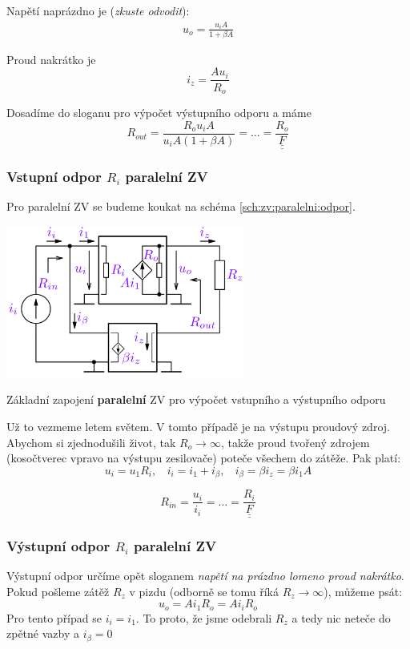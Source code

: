 \documentclass[a4paper,12pt]{article}   %
\begin{document}
Napětí naprázdno je (\textit{zkuste odvodit}):
\begin{align*}
    u_o = \frac{u_i A}{1+\beta A}
\end{align*}

Proud nakrátko je
\begin{equation*}
    i_z = \frac{A u_i}{R_o}
\end{equation*}

Dosadíme do sloganu pro výpočet výstupního odporu a máme
\begin{equation}
    R_{out} = \frac{R_o u_i A}{u_i A(1+\beta A)} =...= \underline{\underline{\frac{R_o}{F}}}
\end{equation}

\subsubsection{Vstupní odpor $R_i$ paralelní ZV}
Pro paralelní ZV se budeme koukat na schéma \ref{sch:zv:paralelni:odpor}.
\begin{schema}[h!]
    \centering
    \includegraphics[height=5cm]{ZV_paralelni-odpory.PNG}
    \caption{Základní zapojení \textbf{paralelní} ZV pro výpočet vstupního a výstupního odporu}
    \label{sch:zv:paralelni:odpor}
\end{schema}

Už to vezmeme letem světem. V tomto případě je na výstupu proudový zdroj. Abychom si zjednodušili život, tak $R_o \rightarrow \infty$, takže proud tvořený zdrojem (kosočtverec vpravo na výstupu zesilovače) poteče všechem do zátěže. Pak platí: 
\begin{equation}
    u_i = u_\text{1} R_i,~~~~i_i=i_\text{1} + i_\beta,~~~~ i_\beta = \beta i_z = \beta i_1 A
\end{equation}

\begin{equation}
    R_{in} = \frac{u_i}{i_i} = \dots = \underline{\underline{\frac{R_i}{F}}}
\end{equation}

\subsubsection{Výstupní odpor $R_i$ paralelní ZV}
Výstupní odpor určíme opět sloganem \textit{napětí na prázdno lomeno proud nakrátko}.
Pokud pošleme zátěž $R_z$ v pizdu (odborně se tomu říká $R_z \rightarrow \infty$), můžeme psát:
\begin{equation*}
    u_o = Ai_\text{1}R_o = Ai_iR_o
\end{equation*}
Pro tento případ se $i_i = i_\text{1}$. To proto, že jsme odebrali $R_z$ a tedy nic neteče do zpětné vazby a $i_\beta = 0$
\end{document}
